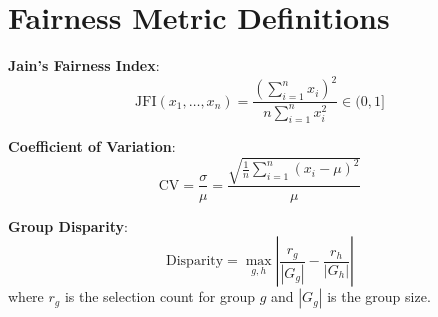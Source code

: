 \documentclass{article}
\begin{document}
\section{Fairness Metric Definitions}

\textbf{Jain's Fairness Index}:
\begin{equation}
\text{JFI}(x_1, \ldots, x_n) = \frac{\left(\sum_{i=1}^{n} x_i\right)^2}{n \sum_{i=1}^{n} x_i^2} \in (0, 1]
\end{equation}

\textbf{Coefficient of Variation}:
\begin{equation}
\text{CV} = \frac{\sigma}{\mu} = \frac{\sqrt{\frac{1}{n}\sum_{i=1}^n (x_i - \mu)^2}}{\mu}
\end{equation}

\textbf{Group Disparity}:
\begin{equation}
\text{Disparity} = \max_{g,h} \left| \frac{r_g}{|G_g|} - \frac{r_h}{|G_h|} \right|
\end{equation}
where $r_g$ is the selection count for group $g$ and $|G_g|$ is the group size.
\end{document}
